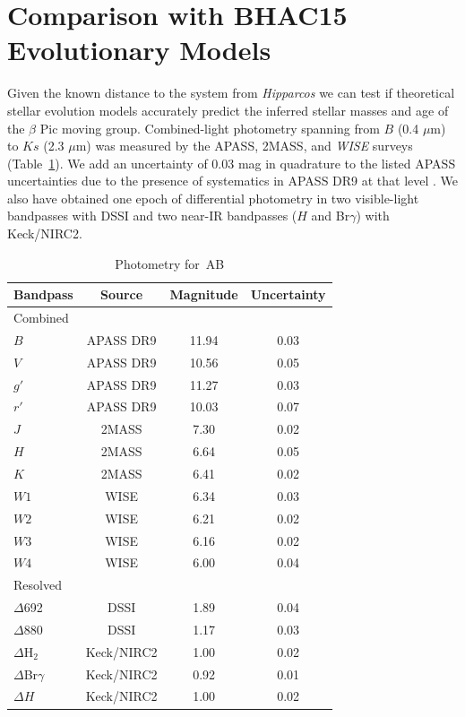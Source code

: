 \section{Comparison with BHAC15 Evolutionary Models}
\label{sec:models}


Given the known distance to the system from \textit{Hipparcos} 
we can test if theoretical stellar evolution models
accurately predict the inferred stellar masses and age of the $\beta$ Pic moving group.
Combined-light photometry spanning from $B$ (0.4 $\mu$m) to $Ks$ (2.3 $\mu$m) was measured by the 
APASS, 2MASS, and \textit{WISE} surveys (Table~\ref{tab:photometry}).
We add an uncertainty of 0.03 mag in quadrature to the listed APASS uncertainties due to
the presence of systematics in APASS DR9 at that level \citep{Henden12}.
We also have obtained one epoch of differential photometry in two visible-light bandpasses with
DSSI and two near-IR bandpasses ($H$ and Br$\gamma$) with Keck/NIRC2.


\begin{table}[hbt!]
\centering
\begin{tabular}{lccc}
\hline
Bandpass & Source & Magnitude & Uncertainty \\
\hline
Combined & & & \\
$B$ &  APASS DR9 & 11.94 & 0.03  \\
$V$ &  APASS DR9 & 10.56 & 0.05 \\
$g'$ & APASS DR9 & 11.27 & 0.03 \\
$r'$ & APASS DR9 & 10.03 & 0.07 \\
$J$ &  2MASS & 7.30 & 0.02 \\
$H$ &  2MASS & 6.64 & 0.05 \\
$K$ &  2MASS & 6.41 & 0.02 \\
$W1$ & WISE & 6.34 & 0.03 \\
$W2$ & WISE & 6.21 & 0.02 \\
$W3$ & WISE & 6.16 & 0.02 \\
$W4$ & WISE & 6.00 & 0.04 \\
\hline
Resolved & & & \\
$\Delta$692 & DSSI & 1.89 & 0.04 \\
$\Delta$880 & DSSI & 1.17 & 0.03 \\
$\Delta$H$_2$ & Keck/NIRC2 & 1.00 & 0.02 \\
$\Delta$Br$\gamma$ & Keck/NIRC2 & 0.92 & 0.01 \\
$\Delta H$ & Keck/NIRC2 & 1.00 & 0.02 \\
\hline
\end{tabular}
\caption{Photometry for \thisstarsix\,AB}
\label{tab:photometry}
\end{table}

